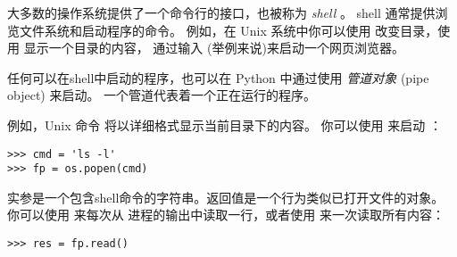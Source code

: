 {{{{{{{大多数的操作系统提供了一个命令行的接口，也被称为 {\em shell} 。
shell 通常提供浏览文件系统和启动程序的命令。
例如，在 Unix 系统中你可以使用  改变目录，使用  显示一个目录的内容，
通过输入  (举例来说)来启动一个网页浏览器。

  


任何可以在shell中启动的程序，也可以在 Python 中通过使用 {\em 管道对象} (pipe object) 来启动。 一个管道代表着一个正在运行的程序。


例如，Unix 命令  将以详细格式显示当前目录下的内容。
你可以使用  来启动  ：

  

\begin{lstlisting}
>>> cmd = 'ls -l'
>>> fp = os.popen(cmd)
\end{lstlisting}

%

实参是一个包含shell命令的字符串。返回值是一个行为类似已打开文件的对象。
你可以使用  来每次从  进程的输出中读取一行，或者使用  来一次读取所有内容：

  
  

\begin{lstlisting}
>>> res = fp.read()
\end{lstlisting}

%

}}}}}}}
